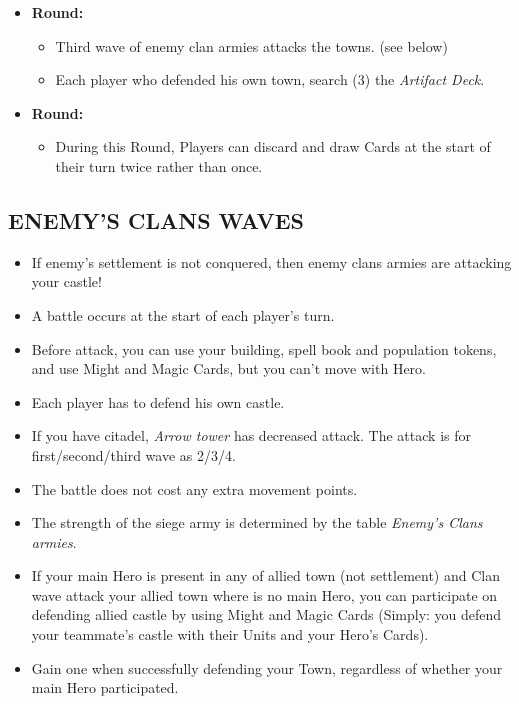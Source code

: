 \begin{multicols}{2}
\begin{itemize}
   \item \textbf{ Round:}
    \begin{itemize}
      \item Third wave of enemy clan armies attacks the towns. (see below)
      \item Each player who defended his own town, search (3) the \textit{Artifact Deck}.
    \end{itemize}
   \item \textbf{ Round:}
    \begin{itemize}
      \item During this Round, Players can discard and draw Cards at the start of their turn twice rather than once.
    \end{itemize}
  \end{itemize}

\subsection*{\MakeUppercase{Enemy's clans waves}}
\begin{itemize}
  \item If enemy's settlement is not conquered, then enemy clans armies are attacking your castle!
  \item A battle occurs at the start of each player's turn.
  \item Before attack, you can use your building, spell book and population tokens, and use Might and Magic Cards, but you can't move with Hero.
  \item Each player has to defend his own castle.
  \item If you have citadel, \textit{Arrow tower} has decreased attack. The attack is for first/second/third wave as 2/3/4.
  \item The battle does not cost any extra movement points.
  \item The strength of the siege army is determined by the table \textit{Enemy's Clans armies}.
  \item If your main Hero is present in any of allied town (not settlement) and Clan wave attack your allied town where is no main Hero, you can participate on defending allied castle by using Might and Magic Cards (Simply: you defend your teammate's castle with their Units and your Hero's Cards).
  \item Gain one  when successfully defending your Town, regardless of whether your main Hero participated.
\end{itemize}


\end{multicols}
